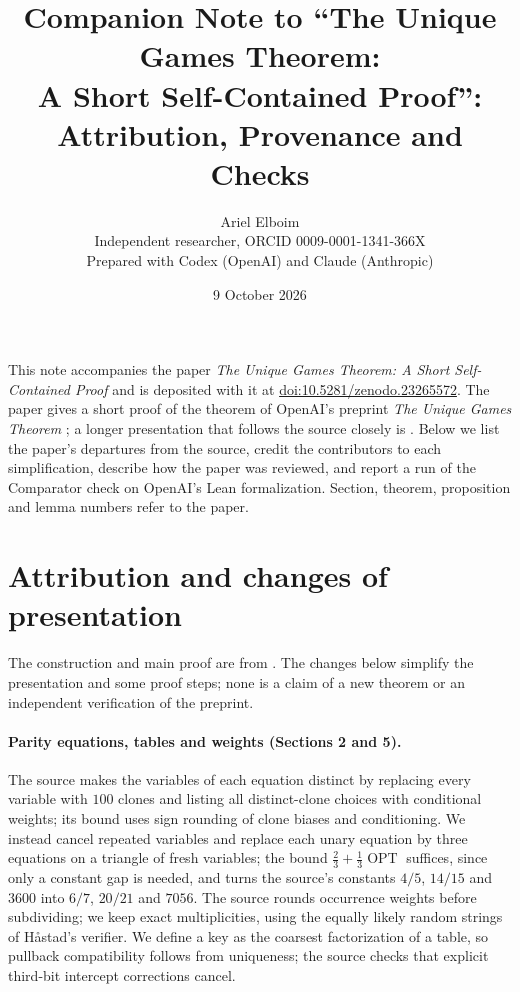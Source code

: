\documentclass[11pt]{article}
\title{Companion Note to ``The Unique Games Theorem:\\ A Short Self-Contained Proof'':\\ Attribution, Provenance and Checks}
\author{Ariel Elboim\\\small Independent researcher, ORCID 0009-0001-1341-366X\\\small Prepared with Codex (OpenAI) and Claude (Anthropic)}
\date{9 October 2026}
\newcommand{\OPT}{\operatorname{OPT}}
\newcommand{\depositdoi}{10.5281/zenodo.23265572}
\begin{document}
\maketitle
\noindent This note accompanies the paper \emph{The Unique Games Theorem:
A Short Self-Contained Proof} \cite{Main} and is deposited with it at
\href{https://doi.org/\depositdoi}{doi:\depositdoi}. The
paper gives a short proof of the theorem of OpenAI's preprint \emph{The
Unique Games Theorem} \cite{UGT}; a longer presentation that follows the
source closely is \cite{Elboim}. Below we list the paper's departures from
the source, credit the contributors to each simplification, describe how
the paper was reviewed, and report a run of the Comparator check on
OpenAI's Lean formalization. Section, theorem, proposition and lemma
numbers refer to the paper.

\section*{Attribution and changes of presentation}

The construction and main proof are from \cite{UGT}. The changes below
simplify the presentation and some proof steps; none is a claim of a new
theorem or an independent verification of the preprint.

\paragraph{Parity equations, tables and weights (Sections 2 and 5).}
The source makes the variables of each equation distinct by replacing
every variable with $100$ clones and listing all distinct-clone choices
with conditional weights; its bound uses sign rounding of clone biases and
conditioning. We instead cancel repeated variables and replace each unary
equation by three equations on a triangle of fresh variables; the bound
$\frac23+\frac13\OPT$ suffices, since only a constant gap is needed, and
turns the source's constants $4/5$, $14/15$ and $3600$ into $6/7$, $20/21$
and $7056$. The source rounds occurrence weights before subdividing; we
keep exact multiplicities, using the equally likely random strings of
H\aa stad's verifier. We define a key as the coarsest factorization of a
table, so pullback compatibility follows from uniqueness; the source
checks that explicit third-bit intercept corrections cancel.
\end{document}
